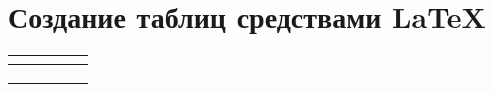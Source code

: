 \documentclass[a4paper,12pt]{article} %
\author{Белорукова Елизавета, ИВТ, 3 курс, 1 подгруппа, Тема 9.\\}
\date{\today}
\begin{document}

\newpage

\section{Создание таблиц средствами \LaTeX}

\begin{tabular}{|p{1.5cm}|p{3.5cm}|p{1.5cm}|p{1.5cm}|p{1.5cm}|}\hline
     & &\multicolumn{3}{c|}{}\\ \hline
     & & & & \\ \hline
     & & & & \\ \hline
     & & & & \\ \hline
\end{tabular}
\end{document}
